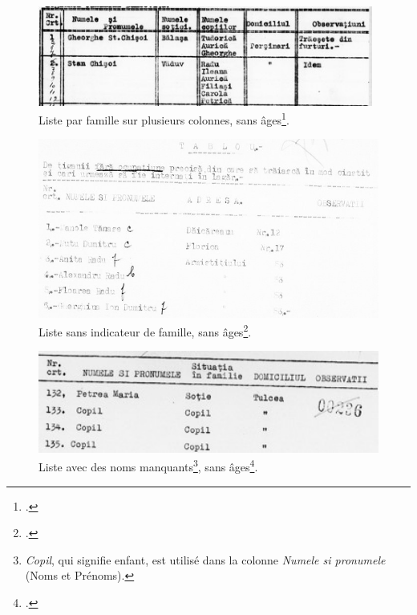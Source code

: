 \documentclass[a4paper,12pt,twoside]{book}
\begin{document}
			    \begin{figure}[!ht]
        			\centering
                    \includegraphics[width=11cm]{images/rg_25_050m_0010_00000502.jpg}
                    \caption{Liste par famille sur plusieurs colonnes, sans âges\footcite[][Copyright \textit{Arhivele Naţionale ale României}]{rg-25.050mfileid:45964SelectedRecordsVarious}.}
                    \label{fig6}
                \end{figure}
                \pagebreak

                \begin{figure}[!ht]
        			\centering
                    \includegraphics[width=13cm]{images/rg_25_050m_0010_00000803.jpg}
                    \caption{Liste sans indicateur de famille, sans âges\footcite[][Copyright \textit{Arhivele Naţionale ale României}]{rg-25.050mfileid:46036SelectedRecordsVarious}.}
                    \label{fig7}
                \end{figure}
                
                \begin{figure}[!ht]
        			\centering
                    \includegraphics[width=13cm]{images/rg_25_050m_0012_00000204.jpg}
                    \caption[Liste avec des noms manquants]{Liste avec des noms manquants\footnote{\textit{Copil}, qui signifie enfant, est utilisé dans la colonne \textit{Numele si pronumele} (Noms et Prénoms).}, sans âges\footcite[][Copyright \textit{Arhivele Naţionale ale României}]{rg-25.050mfileid:46415SelectedRecordsVarious}.}
                    \label{fig8}
                \end{figure}
                
\end{document}
